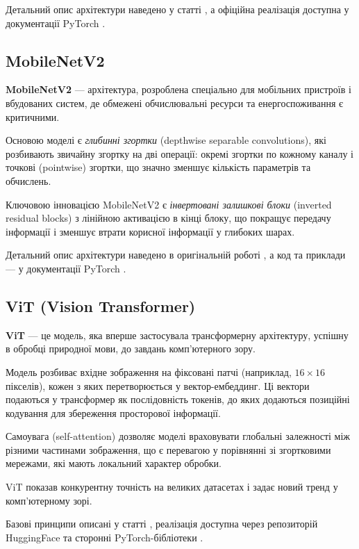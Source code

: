 \documentclass[14pt,a4paper]{extarticle}
\begin{document}
Детальний опис архітектури наведено у статті \cite{resnet}, а офіційна реалізація доступна у документації PyTorch \cite{pytorch_models}.

\subsection{MobileNetV2}
\textbf{MobileNetV2} --- архітектура, розроблена спеціально для мобільних пристроїв і вбудованих систем, де обмежені обчислювальні ресурси та енергоспоживання є критичними.

Основою моделі є \emph{глибинні згортки} (depthwise separable convolutions), які розбивають звичайну згортку на дві операції: окремі згортки по кожному каналу і точкові (pointwise) згортки, що значно зменшує кількість параметрів та обчислень.

Ключовою інновацією MobileNetV2 є \emph{інвертовані залишкові блоки} (inverted residual blocks) з лінійною активацією в кінці блоку, що покращує передачу інформації і зменшує втрати корисної інформації у глибоких шарах.

Детальний опис архітектури наведено в оригінальній роботі \cite{mobilenetv2}, а код та приклади — у документації PyTorch \cite{pytorch_models}.

\subsection{ViT (Vision Transformer)}
\textbf{ViT} --- це модель, яка вперше застосувала трансформерну архітектуру, успішну в обробці природної мови, до завдань комп’ютерного зору.

Модель розбиває вхідне зображення на фіксовані патчі (наприклад, $16 \times 16$ пікселів), кожен з яких перетворюється у вектор-ембеддинг. Ці вектори подаються у трансформер як послідовність токенів, до яких додаються позиційні кодування для збереження просторової інформації.

Самоувага (self-attention) дозволяє моделі враховувати глобальні залежності між різними частинами зображення, що є перевагою у порівнянні зі згортковими мережами, які мають локальний характер обробки.

ViT показав конкурентну точність на великих датасетах і задає новий тренд у комп’ютерному зорі.

Базові принципи описані у статті \cite{vit}, реалізація доступна через репозиторій HuggingFace \cite{huggingface_vit} та сторонні PyTorch-бібліотеки \cite{lucidrains_vit_pytorch}.
\end{document}
